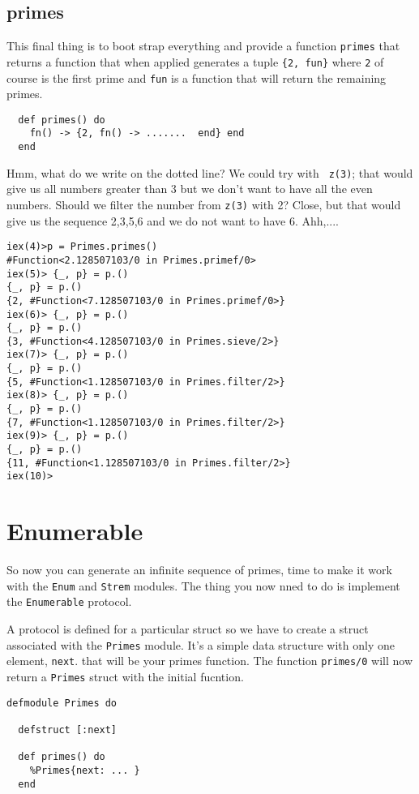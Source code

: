 \documentclass[a4paper,11pt]{article}
\begin{document}
\subsection*{primes}

This final thing is to boot strap everything and provide a function
{\tt primes} that returns a function that when applied generates a
tuple {\tt \{2, fun\}} where {\tt 2} of course is the first prime and
{\tt fun} is a function that will return the remaining primes.

\begin{verbatim}
  def primes() do
    fn() -> {2, fn() -> .......  end} end
  end
\end{verbatim}

Hmm, what do we write on the dotted line? We could try with {\tt
  z(3)}; that would give us all numbers greater than 3 but we don't
want to have all the even numbers. Should we filter the number from
{\tt z(3)} with 2? Close, but that would give us the sequence 2,3,5,6
and we do not want to have 6. Ahh,....

\begin{verbatim}
iex(4)>p = Primes.primes()
#Function<2.128507103/0 in Primes.primef/0>
iex(5)> {_, p} = p.()
{_, p} = p.()
{2, #Function<7.128507103/0 in Primes.primef/0>}
iex(6)> {_, p} = p.()
{_, p} = p.()
{3, #Function<4.128507103/0 in Primes.sieve/2>}
iex(7)> {_, p} = p.()
{_, p} = p.()
{5, #Function<1.128507103/0 in Primes.filter/2>}
iex(8)> {_, p} = p.()
{_, p} = p.()
{7, #Function<1.128507103/0 in Primes.filter/2>}
iex(9)> {_, p} = p.()
{_, p} = p.()
{11, #Function<1.128507103/0 in Primes.filter/2>}
iex(10)>
\end{verbatim}


\section*{Enumerable}

So now you can generate an infinite sequence of primes, time to make
it work with the {\tt Enum} and {\tt Strem} modules. The thing you now
nned to do is implement the {\tt Enumerable} protocol.

A protocol is defined for a particular struct so we have to create a
struct associated with the {\tt Primes} module. It's a simple data
structure with only one element, {\tt next}. that will be your primes
function. The function {\tt primes/0} will now return a {\tt Primes}
struct with the initial fucntion. 

\begin{verbatim}
defmodule Primes do

  defstruct [:next]

  def primes() do
    %Primes{next: ... }
  end
\end{verbatim}
\end{document}
